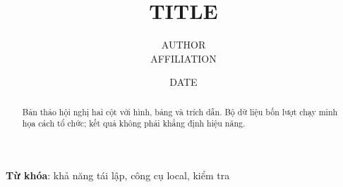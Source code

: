 \documentclass[twocolumn]{article}
\title{{{TITLE}}}
\author{{{AUTHOR}} \\ {{AFFILIATION}}}
\date{{{DATE}}}
\begin{document}
\maketitle
\begin{abstract}Bản thảo hội nghị hai cột với hình, bảng và trích dẫn. Bộ dữ liệu bốn lượt chạy minh họa cách tổ chức; kết quả không phải khẳng định hiệu năng.\end{abstract}
\textbf{Từ khóa}: khả năng tái lập, công cụ local, kiểm tra





\end{document}
